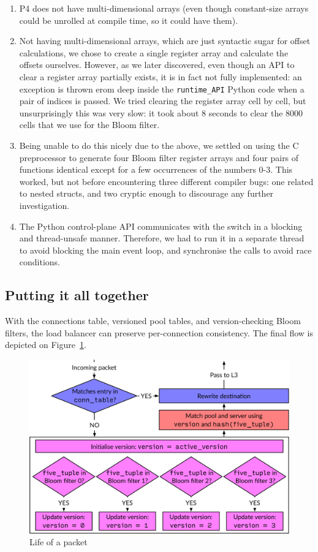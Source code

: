 \documentclass[11pt,oneside,a4paper]{article}
\begin{document}
\begin{enumerate}
\item P4 does not have multi-dimensional arrays (even though constant-size
    arrays could be unrolled at compile time, so it could have them).
\item Not having multi-dimensional arrays, which are just syntactic sugar for
    offset calculations, we chose to create a single register array and
    calculate the offsets ourselves.
    However, as we later discovered, even though an API to clear a register array
    partially exists, it is in fact not fully implemented: an exception is thrown
    erom deep inside the \texttt{runtime\_API} Python code when a pair of indices is
    passed.
    We tried clearing the register array cell by cell, but unsurprisingly this
    was very slow: it took about 8 seconds to clear the 8000 cells that we use
    for the Bloom filter.
\item Being unable to do this nicely due to the above, we settled on using the C
    preprocessor to generate four Bloom filter register arrays and four pairs of
    functions identical except for a few occurrences of the numbers 0-3.
    This worked, but not before encountering three different compiler bugs: one
    related to nested structs, and two cryptic enough to discourage any further
    investigation.
\item The Python control-plane API communicates with the switch in a blocking and
    thread-unsafe manner.
    Therefore, we had to run it in a separate thread to avoid blocking the main
    event loop, and synchronise the calls to avoid race conditions.
\end{enumerate}

\subsection{Putting it all together}

With the connections table, versioned pool tables, and version-checking Bloom
filters, the load balancer can preserve per-connection consistency.
The final flow is depicted on Figure~\ref{fig:life-of-a-packet}.

\begin{figure}[h]
\centering
\includegraphics[width=.8\textwidth]{figures/life-of-a-packet.pdf}
\caption{Life of a packet}
\label{fig:life-of-a-packet}
\end{figure}
\end{document}
